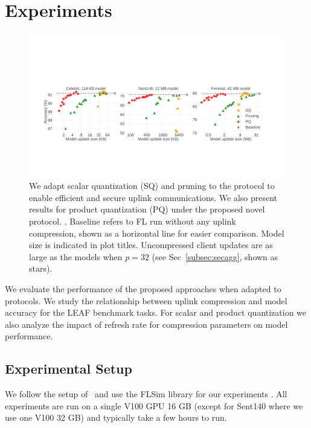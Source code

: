 \section{Experiments}
\label{sec:experiments}

\begin{figure}[t]
    \centering
    \includegraphics[width=\textwidth]{figs/results_summary.pdf}
    \vspace{-5mm}
    \caption{\label{fig:results_summary}
    We adapt scalar quantization (SQ) and pruning to the \SecAgg protocol to enable efficient and secure uplink communications. We also present results for product quantization (PQ) under the proposed novel \SecInd protocol. . Baseline refers to \SecAgg FL run without any uplink compression, shown as a horizontal line for easier comparison. Model size is indicated in plot titles. Uncompressed client updates are as large as the models when $p=32$ (see Sec~\ref{subsec:secagg}, shown as stars). 
    }
\end{figure}

We evaluate the performance of the proposed approaches when adapted to \SecAgg protocols. 
We study the relationship between uplink compression and model accuracy for the LEAF benchmark tasks. 
For scalar and product quantization we also analyze the impact of refresh rate for compression parameters on  model performance.

\subsection{Experimental Setup}
\label{subsec:setup}
We follow the setup of~\cite{nguyen2021federated} and use the {FLSim library}
for our experiments
. 
All experiments are run on a single V100 GPU 16 GB (except for Sent140 where we use one V100 32 GB) and typically take a few hours to run. 

